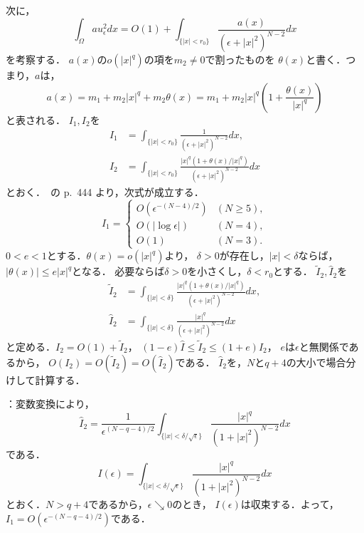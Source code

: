 次に，
\[
 \int_\Omega au_\epsilon^2 dx = O(1) + \int_{ \{ \lvert x \rvert <
 r_0 \} } \frac{a(x)}{(\epsilon +
 \lvert x \rvert^2)^{N-2}} dx 
\]
を考察する．
$a(x)$の$o(\lvert x \rvert^q)$の項を$m_2 \neq 0$で割ったものを
$\theta(x)$と書く．つまり，$a$は，
\[
 a(x) = m_1 + m_2 \lvert x \rvert^q + m_2 \theta(x) 
 = m_1 + m_2 \lvert x \rvert^q \left( 1 + \frac{\theta(x)}{\lvert
 x \rvert^q } \right)
\]
と表される．
$I_1, I_2$を
\begin{align*}
 I_1 &= 
 \int_{ \{ \lvert x \rvert <
 r_0 \} } \frac{1}{(\epsilon +
 \lvert x \rvert^2)^{N-2}} dx, \\
 I_2 &= 
 \int_{ \{ \lvert x \rvert <
 r_0 \} } \frac{ \lvert x \rvert^q \left( 1 + \theta(x) / \lvert x
 \rvert^q \right)}{(\epsilon +
 \lvert x \rvert^2)^{N-2}} dx
\end{align*}
とおく．\cite{MR709644}~の p.~444 より，次式が成立する．
\[
 I_1 = \begin{cases}
        O(\epsilon^{-(N-4)/2}) & (N \geq 5),\\
        O(\lvert \log \epsilon \rvert) & (N = 4), \\ 
        O(1) & (N = 3).
       \end{cases}
\]
$0 < e < 1$とする．$\theta (x) = o(\lvert x \rvert^q)$より，
$\delta > 0$が存在し，$\lvert x \rvert < \delta$ならば，
$\lvert \theta (x) \rvert \leq e \lvert x \rvert^q$となる．
必要ならば$\delta > 0$を小さくし，$\delta < r_0$とする．
$\tilde{I}_2, \hat{I}_2$を
\begin{align*}
 \tilde{I}_2 &= 
 \int_{ \{ \lvert x \rvert <
 \delta \} } \frac{ \lvert x \rvert^q \left( 1 + \theta(x) / \lvert x
 \rvert^q \right)}{(\epsilon +
 \lvert x \rvert^2)^{N-2}} dx, \\ 
 \hat{I}_2 &= 
 \int_{ \{ \lvert x \rvert <
 \delta \} } \frac{ \lvert x \rvert^q }{(\epsilon +
 \lvert x \rvert^2)^{N-2}} dx
\end{align*}
と定める．$I_2 = O(1) + \tilde{I}_2$，
$(1 - e)\hat{I} \leq \tilde{I}_2 \leq (1 + e)\hat{I}_2$，
$e$は$\epsilon$と無関係であるから，
$O(I_2) = O(\tilde{I}_2) = O(\hat{I}_2)$である．
$\hat{I}_2$を，$N$と$q + 4$の大小で場合分けして計算する．

：変数変換により，
\[
 \hat{I}_2 = \frac{1}{\epsilon^{(N-q - 4)/2}} \int_{ \{ \lvert x
 \rvert < \delta / \sqrt{\epsilon}\}} 
 \frac{ \lvert x \rvert^{q}}{(1 +
 \lvert x \rvert^2)^{N-2}} dx
\]
である．
\[
 I(\epsilon) = \int_{ \{ \lvert x
 \rvert < \delta / \sqrt{\epsilon}\}} 
 \frac{ \lvert x \rvert^{q}}{(1 +
 \lvert x \rvert^2)^{N-2}} dx
\]
とおく．$N > q + 4$であるから，$\epsilon \searrow 0$のとき，
$I(\epsilon)$は収束する．よって，$I_1 =
O(\epsilon^{-(N-q-4)/2})$である．

